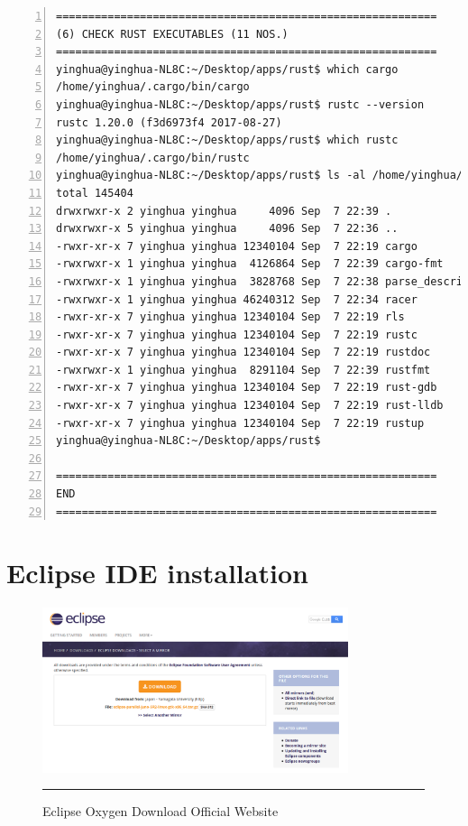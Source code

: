 \begin{lstlisting}[breaklines, frame=single, numbers=left, caption={Linux command for Rust compiler installation}, label=commandline-02]
===========================================================
(6) CHECK RUST EXECUTABLES (11 NOS.)
===========================================================
yinghua@yinghua-NL8C:~/Desktop/apps/rust$ which cargo
/home/yinghua/.cargo/bin/cargo
yinghua@yinghua-NL8C:~/Desktop/apps/rust$ rustc --version
rustc 1.20.0 (f3d6973f4 2017-08-27)
yinghua@yinghua-NL8C:~/Desktop/apps/rust$ which rustc
/home/yinghua/.cargo/bin/rustc
yinghua@yinghua-NL8C:~/Desktop/apps/rust$ ls -al /home/yinghua/.cargo/bin/
total 145404
drwxrwxr-x 2 yinghua yinghua     4096 Sep  7 22:39 .
drwxrwxr-x 5 yinghua yinghua     4096 Sep  7 22:36 ..
-rwxr-xr-x 7 yinghua yinghua 12340104 Sep  7 22:19 cargo
-rwxrwxr-x 1 yinghua yinghua  4126864 Sep  7 22:39 cargo-fmt
-rwxrwxr-x 1 yinghua yinghua  3828768 Sep  7 22:38 parse_describe
-rwxrwxr-x 1 yinghua yinghua 46240312 Sep  7 22:34 racer
-rwxr-xr-x 7 yinghua yinghua 12340104 Sep  7 22:19 rls
-rwxr-xr-x 7 yinghua yinghua 12340104 Sep  7 22:19 rustc
-rwxr-xr-x 7 yinghua yinghua 12340104 Sep  7 22:19 rustdoc
-rwxrwxr-x 1 yinghua yinghua  8291104 Sep  7 22:39 rustfmt
-rwxr-xr-x 7 yinghua yinghua 12340104 Sep  7 22:19 rust-gdb
-rwxr-xr-x 7 yinghua yinghua 12340104 Sep  7 22:19 rust-lldb
-rwxr-xr-x 7 yinghua yinghua 12340104 Sep  7 22:19 rustup
yinghua@yinghua-NL8C:~/Desktop/apps/rust$ 

===========================================================
END
===========================================================

\end{lstlisting}  

\pagebreak

\section{Eclipse IDE installation}

\begin{figure}[H]
	\centering
	\includegraphics[width=0.8\textwidth]{Figure/AppendixA/eclipse-download-website.png}
	\rule{35em}{0.5pt}
	\caption[Eclipse Oxygen Download Official Website]{Eclipse Oxygen Download Official Website}
\end{figure}

